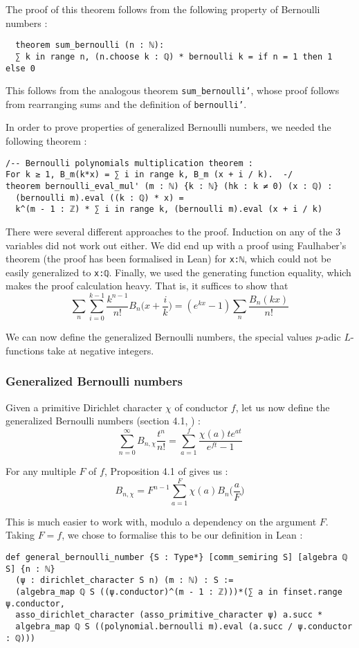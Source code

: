 \documentclass[a4paper,UKenglish,cleveref, autoref, thm-restate]{lipics-v2021}
\newcommand{\lean}[1]{\texttt{#1}\xspace} %
\begin{document}
The proof of this theorem follows from the following property of Bernoulli numbers :

\begin{lstlisting}
  theorem sum_bernoulli (n : ℕ):
  ∑ k in range n, (n.choose k : ℚ) * bernoulli k = if n = 1 then 1 else 0
\end{lstlisting}

This follows from the analogous theorem \lean{sum\_bernoulli'}, whose proof follows from rearranging
sums and the definition of \lean{bernoulli'}. 

In order to prove properties of generalized Bernoulli numbers, we needed the following theorem :
\begin{lstlisting}
/-- Bernoulli polynomials multiplication theorem :
For k ≥ 1, B_m(k*x) = ∑ i in range k, B_m (x + i / k).  -/
theorem bernoulli_eval_mul' (m : ℕ) {k : ℕ} (hk : k ≠ 0) (x : ℚ) :
  (bernoulli m).eval ((k : ℚ) * x) = 
  k^(m - 1 : ℤ) * ∑ i in range k, (bernoulli m).eval (x + i / k) 
\end{lstlisting}

There were several different approaches to the proof. Induction on any of the 3 variables did not work 
out either. We did end up with a proof using Faulhaber's theorem (the proof has been formalised in Lean) 
for \lean{x:ℕ}, which could not be easily generalized to \lean{x:ℚ}. Finally, we used the generating function 
equality, which makes the proof calculation heavy. That is, it suffices to show that 
$$ \sum_n \sum_{i = 0}^{k - 1} \frac{k^{n - 1}}{n!} B_n \bigg(x + \frac{i}{k} \bigg) = (e^{kx} - 1) \sum_n \frac{B_n (kx)}{n!} $$

We can now define the generalized Bernoulli numbers, the special values $p$-adic $L$-functions take at negative integers.

\subsubsection{Generalized Bernoulli numbers}
Given a primitive Dirichlet character $\chi$ of conductor $f$, let us now define the generalized
Bernoulli numbers (section 4.1, \cite{cyc}) :
$$ \sum_{n = 0}^{\infty} B_{n,\chi} \frac{t^n}{n!} = \sum_{a = 1}^f \frac{\chi(a)t e^{at}}{e^{ft} - 1} $$

For any multiple $F$ of $f$, Proposition 4.1 of \cite{cyc} gives us : 
$$ B_{n, \chi} = F^{n - 1} \sum_{a = 1}^{F} \chi (a) B_n \bigg( \frac{a}{F} \bigg) $$

This is much easier to work with, modulo a dependency on the argument $F$. Taking $F = f$, we chose to formalise this 
to be our definition in Lean :
\begin{lstlisting}
def general_bernoulli_number {S : Type*} [comm_semiring S] [algebra ℚ S] {n : ℕ} 
  (ψ : dirichlet_character S n) (m : ℕ) : S :=
  (algebra_map ℚ S ((ψ.conductor)^(m - 1 : ℤ)))*(∑ a in finset.range ψ.conductor,
  asso_dirichlet_character (asso_primitive_character ψ) a.succ * 
  algebra_map ℚ S ((polynomial.bernoulli m).eval (a.succ / ψ.conductor : ℚ)))
\end{lstlisting}
\end{document}
